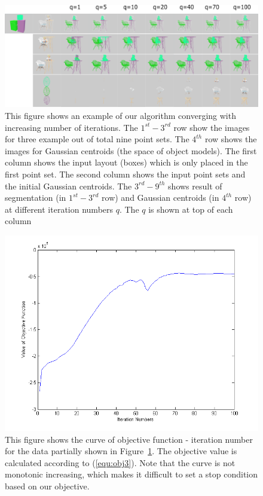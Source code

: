 \begin{figure}
	\centering
	\includegraphics[width=\linewidth]{images/Initialization/iters}
	\caption{\label{fig:iter} This figure shows an example of our algorithm converging with increasing number of iterations. The $1^{st}-3^{rd}$ row show the images for three example out of total nine point sets. The $4^{th}$ row shows the images for Gaussian centroids (the space of object models). The first column shows the input layout (boxes) which is only placed in the first point set. The second column shows the input point sets and the initial Gaussian centroids. The $3^{rd}-9^{th}$ shows result of segmentation (in $1^{st}-3^{rd}$ row) and Gaussian centroids (in $4^{th}$ row) at different iteration numbers $q$. The $q$ is shown at top of each column}
\end{figure}

\begin{figure}
	\centering
	\includegraphics[width=\linewidth]{images/Initialization/obj_iter.png}
	\caption{\label{fig:iter_curve}This figure shows the curve of objective function - iteration number for the data partially shown in Figure~\ref{fig:iter}. The objective value is calculated according to (\ref{equ:obj3}). Note that the curve is not monotonic increasing, which makes it difficult to set a stop condition based on our objective.}
\end{figure}


